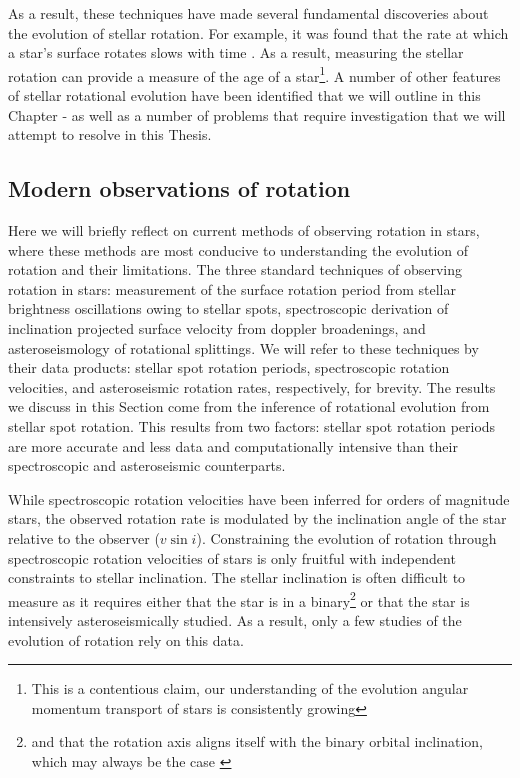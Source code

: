 As a result, these techniques have made several fundamental discoveries about the evolution of stellar rotation.
For example, it was found that the rate at which a star's surface rotates slows with time \citep{skumanich_time_1972}.
As a result, measuring the stellar rotation can provide a measure of the age of a star\footnote{This is a contentious claim, our understanding of the evolution angular momentum transport of stars is consistently growing}.
A number of other features of stellar rotational evolution have been identified that we will outline in this Chapter - as well as a number of problems that require investigation that we will attempt to resolve in this Thesis.

\subsection{Modern observations of rotation}

Here we will briefly reflect on current methods of observing rotation in stars, where these methods are most conducive to understanding the evolution of rotation and their limitations.
The three standard techniques of observing rotation in stars: measurement of the surface rotation period from stellar brightness oscillations owing to stellar spots, spectroscopic derivation of inclination projected surface velocity from doppler broadenings, and asteroseismology of rotational splittings.
We will refer to these techniques by their data products: stellar spot rotation periods, spectroscopic rotation velocities, and asteroseismic rotation rates, respectively, for brevity.
The results we discuss in this Section come from the inference of rotational evolution from stellar spot rotation.
This results from two factors: stellar spot rotation periods are more accurate and less data and computationally intensive than their spectroscopic and asteroseismic counterparts.

While spectroscopic rotation velocities have been inferred for orders of magnitude stars, the observed rotation rate is modulated by the inclination angle of the star relative to the observer ($v\sin{i}$).
Constraining the evolution of rotation through spectroscopic rotation velocities of stars is only fruitful with independent constraints to stellar inclination.
The stellar inclination is often difficult to measure as it requires either that the star is in a binary\footnote{and that the rotation axis aligns itself with the binary orbital inclination, which may always be the case \citet{albrecht_banana_2011,albrecht_banana_2013}} or that the star is intensively asteroseismically studied.
As a result, only a few studies of the evolution of rotation rely on this data.


